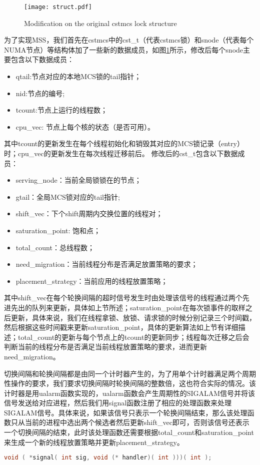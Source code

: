 \begin{figure}[t]
	\centering
	\texttt{[image: struct.pdf]}
	\caption{Modification on the original cstmcs lock structure}
	\label{Fig:struct}
\end{figure}

为了实现MSS，我们首先在cstmcs中的cst\_t（代表cstmcs锁）和snode（代表每个NUMA节点）等结构体加了一些新的数据成员，如图\ref{Fig:struct}所示，修改后每个snode主要包含以下数据成员：
\begin{itemize}
\item qtail:节点对应的本地MCS锁的tail指针；
\item nid:节点的编号;
\item tcount:节点上运行的线程数；
\item cpu\_vec: 节点上每个核的状态（是否可用）。
\end{itemize}
其中tcount的更新发生在每个线程初始化和销毁其对应的MCS锁记录（entry）时；cpu\_vec的更新发生在每次线程迁移前后。
修改后的cst\_t包含以下数据成员：
\begin{itemize}
\item serving\_node：当前全局锁锁在的节点；
\item gtail：全局MCS锁对应的tail指针;
\item shift\_vec：下个shift周期内交换位置的线程对；
\item saturation\_point: 饱和点；
\item total\_count：总线程数；
\item need\_migration：当前线程分布是否满足放置策略的要求；
\item placement\_strategy：当前应用的线程放置策略；
\end{itemize}
其中shift\_vec在每个轮换间隔的超时信号发生时由处理该信号的线程通过两个先进先出的队列来更新，具体如上节所述；saturation\_point在每次锁事件的取样之后更新，具体来说，我们在线程拿锁、放锁、请求锁的时候分别记录三个时间戳，然后根据这些时间戳来更新saturation\_point，具体的更新算法如上节有详细描述；total\_count的更新与每个节点上的tcount的更新同步；线程每次迁移之后会判断当前的线程分布是否满足当前线程放置策略的要求，进而更新need\_migration。

切换间隔和轮换间隔都是由同一个计时器产生的，为了用单个计时器满足两个周期性操作的要求，我们要求切换间隔时轮换间隔的整数倍，这也符合实际的情况。该计时器是用ualarm函数实现的，ualarm函数会产生周期性的SIGALAM信号并将该信号发送给对应进程，然后我们用signal函数注册了相应的处理函数来处理SIGALAM信号。具体来说，如果该信号只表示一个轮换间隔结束，那么该处理函数只从当前的进程中选出两个候选者然后更新shift\_vec即可，否则该信号还表示一个切换间隔的结束，此时该处理函数还需要根据total\_count和saturation\_point来生成一个新的线程放置策略并更新placement\_strategy。
\begin{lstlisting}[language={C}, caption={注册信号处理函数}]
void ( *signal( int sig, void (* handler)( int )))( int );
\end{lstlisting}

